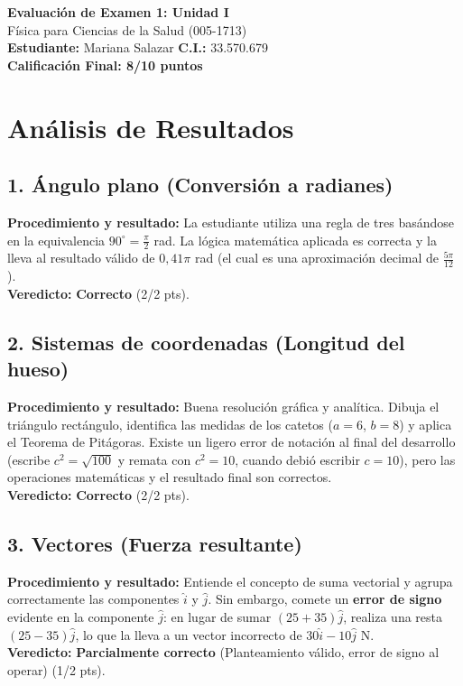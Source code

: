 \documentclass[12pt]{article}
\begin{document}
\begin{center}
    \Large \textbf{Evaluación de Examen 1: Unidad I} \\
    \large Física para Ciencias de la Salud (005-1713) \\
    \vspace{0.5cm}
    \textbf{Estudiante:} Mariana Salazar \quad \textbf{C.I.:} 33.570.679
    \vspace{0.3cm} \\
    \large \textbf{Calificación Final: 8/10 puntos}
\end{center}

\vspace{0.5cm}

\section*{Análisis de Resultados}

\subsection*{1. Ángulo plano (Conversión a radianes)}
\textbf{Procedimiento y resultado:} La estudiante utiliza una regla de tres basándose en la equivalencia $90^\circ = \frac{\pi}{2}$ rad. La lógica matemática aplicada es correcta y la lleva al resultado válido de $0,41\pi$ rad (el cual es una aproximación decimal de $\frac{5\pi}{12}$). \\
\textbf{Veredicto:} \textbf{Correcto} (2/2 pts).

\subsection*{2. Sistemas de coordenadas (Longitud del hueso)}
\textbf{Procedimiento y resultado:} Buena resolución gráfica y analítica. Dibuja el triángulo rectángulo, identifica las medidas de los catetos ($a=6$, $b=8$) y aplica el Teorema de Pitágoras. Existe un ligero error de notación al final del desarrollo (escribe $c^2 = \sqrt{100}$ y remata con $c^2 = 10$, cuando debió escribir $c=10$), pero las operaciones matemáticas y el resultado final son correctos. \\
\textbf{Veredicto:} \textbf{Correcto} (2/2 pts).

\subsection*{3. Vectores (Fuerza resultante)}
\textbf{Procedimiento y resultado:} Entiende el concepto de suma vectorial y agrupa correctamente las componentes $\hat{i}$ y $\hat{j}$. Sin embargo, comete un \textbf{error de signo} evidente en la componente $\hat{j}$: en lugar de sumar $(25 + 35)\hat{j}$, realiza una resta $(25 - 35)\hat{j}$, lo que la lleva a un vector incorrecto de $30\hat{i} - 10\hat{j}$ N. \\
\textbf{Veredicto:} \textbf{Parcialmente correcto} (Planteamiento válido, error de signo al operar) (1/2 pts).
\end{document}
